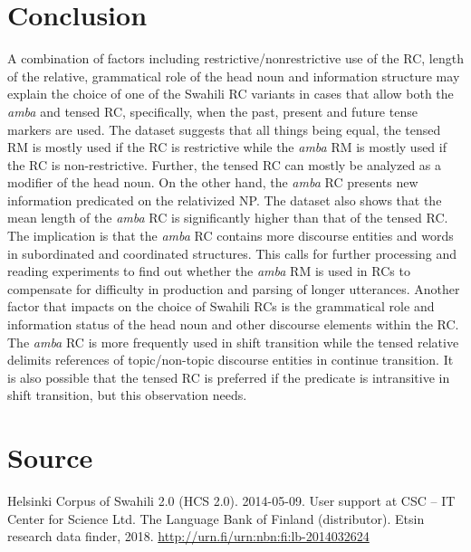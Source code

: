 \documentclass[output=paper,colorlinks,citecolor=brown]{langscibook}
\begin{document}
\section{Conclusion}\label{sec:mwamzandi:5}
\begin{sloppypar}
A combination of factors including restrictive/nonrestrictive use of the RC, length of the relative, grammatical role of the head noun and information structure may explain the choice of one of the Swahili RC variants in cases that allow both the \textit{amba} and tensed RC, specifically, when the past, present and future tense markers are used. The dataset suggests that all things being equal, the tensed RM is mostly used if the RC is restrictive while the \textit{amba} RM is mostly used if the RC is non-restrictive. Further, the tensed RC can mostly be analyzed as a modifier of the head noun. On the other hand, the \textit{amba} RC presents new information predicated on the relativized NP. The dataset also shows that the mean length of the \textit{amba} RC is significantly higher than that of the tensed RC. The implication is that the \textit{amba} RC contains more discourse entities and words in subordinated and coordinated structures. This calls for further processing and reading experiments to find out whether the \textit{amba} RM is used in RCs to compensate for difficulty in production and parsing of longer utterances. Another factor that impacts on the choice of Swahili RCs is the grammatical role and information status of the head noun and other discourse elements within the RC. The \textit{amba} RC is more frequently used in shift transition while the tensed relative delimits references of topic\slash non-topic discourse entities in continue transition. It is also possible that the tensed RC is preferred if the predicate is intransitive in shift transition, but this observation needs.
\end{sloppypar}
\section*{Source}

Helsinki Corpus of Swahili 2.0 (HCS 2.0). 2014-05-09. User support at CSC -- IT Center for Science Ltd. The Language Bank of Finland (distributor). Etsin research data finder, 2018. \url{http://urn.fi/urn:nbn:fi:lb-2014032624}
\end{document}
